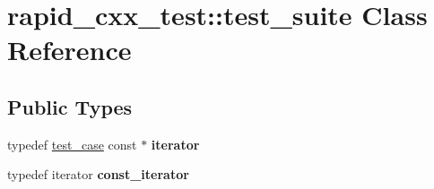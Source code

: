 \hypertarget{classrapid__cxx__test_1_1test__suite}{}\section{rapid\+\_\+cxx\+\_\+test\+:\+:test\+\_\+suite Class Reference}
\label{classrapid__cxx__test_1_1test__suite}
\subsection*{Public Types}
\begin{DoxyCompactItemize}
\item 
\mbox{\label{classrapid__cxx__test_1_1test__suite_a12af81a9c25aa3a02f0635dd762dc4de}} 
typedef \mbox{\hyperlink{structrapid__cxx__test_1_1test__case}{test\+\_\+case}} const  $\ast$ {\bfseries iterator}
\item 
\mbox{\label{classrapid__cxx__test_1_1test__suite_adde2f4a0b17a24fdad42a4781425ddd6}} 
typedef iterator {\bfseries const\+\_\+iterator}
\end{DoxyCompactItemize}
